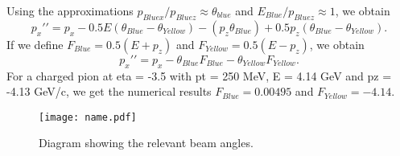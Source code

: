 \documentclass[12pt,oneside,openary]{article}
\begin{document}
Using the approximations $p_{Bluex}/p_{Bluez} \approx \theta_{blue}$ and $E_{Blue}/p_{Bluez} \approx 1$,
we obtain
\begin{equation}
p_{x}\prime\prime = p_{x} -  0.5E(\theta_{Blue}-\theta_{Yellow}) - (p_z \theta_{Blue})+0.5 p_{z} (\theta_{Blue}-\theta_{Yellow}).
\end{equation}
If we define $F_{Blue} = 0.5(E+p_z)$
and 
$F_{Yellow} = 0.5(E-p_z)$,
we obtain
\begin{equation}
p_{x}\prime\prime = p_{x} -\theta_{Blue}F_{Blue} - \theta_{Yellow}F_{Yellow}.
\end{equation}
For a charged pion at eta = -3.5 with pt = 250 MeV, E = 4.14 GeV and pz = -4.13 GeV/c, we get the numerical results
$F_{Blue} = 0.00495$
and 
$F_{Yellow} = -4.14$.

\begin{figure}
\begin{center}
\texttt{[image: name.pdf]}
\caption{Diagram showing the relevant beam angles.}
\label{fig:diagram1}
\end{center}
\end{figure}

\end{document}
